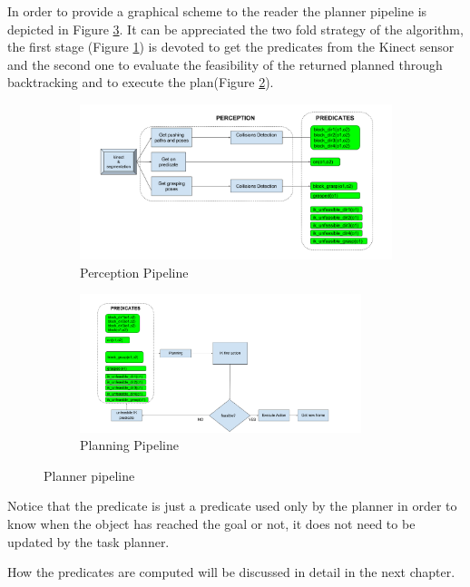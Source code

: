 In order to provide a graphical scheme to the reader the planner pipeline is depicted in Figure \ref{fig:pipeline}. It can be appreciated the two fold strategy of the algorithm, the first stage (Figure \ref{fig:pipeline1}) is devoted to get the predicates from the Kinect sensor and the second one to evaluate the feasibility of the returned planned through backtracking and to execute the plan(Figure \ref{fig:pipeline2}).

\begin{figure}[t]
\centering
\begin{subfigure}[t]{\textwidth}
\centering
\includegraphics[width=\textwidth]{Img/planning/Pipeline1.png}
\caption{Perception Pipeline}\label{fig:pipeline1}
\end{subfigure}
\begin{subfigure}[t]{\textwidth}
\centering
\includegraphics[width=0.9\textwidth]{Img/planning/Pipeline2.png}
\caption{Planning Pipeline}\label{fig:pipeline2}
\end{subfigure}
\caption{Planner pipeline}\label{fig:pipeline}
\end{figure}

Notice that the  predicate is just a predicate used only by the planner in order to know when the object has reached the goal or not, it does not need to be updated by the task planner. 

\mbox{}

How the predicates are computed will be discussed in detail in the next chapter.



